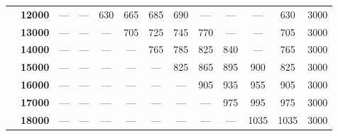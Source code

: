\documentclass[12pt,a4paper,twoside,openright,titlepage,final]{article}
\begin{document}
\begin{table}[htbp!]
{\begin{tabular}{|ccccccccccccc|}
\multicolumn{1}{|c|}{}                                & \textbf{12000}        & ---           & ---           & 630           & 665            & 685            & 690            & ---            & ---            & ---            & 630                                                                 & 3000                                                                  \\
\multicolumn{1}{|c|}{}                                & \textbf{13000}        & ---           & ---           & ---           & 705            & 725            & 745            & 770            & ---            & ---            & 705                                                                 & 3000                                                                  \\
\multicolumn{1}{|c|}{}                                & \textbf{14000}        & ---           & ---           & ---           & ---            & 765            & 785            & 825            & 840            & ---            & 765                                                                 & 3000                                                                  \\
\multicolumn{1}{|c|}{}                                & \textbf{15000}        & ---           & ---           & ---           & ---            & ---            & 825            & 865            & 895            & 900            & 825                                                                 & 3000                                                                  \\
\multicolumn{1}{|c|}{}                                & \textbf{16000}        & ---           & ---           & ---           & ---            & ---            & ---            & 905            & 935            & 955            & 905                                                                 & 3000                                                                  \\
\multicolumn{1}{|c|}{}                                & \textbf{17000}        & ---           & ---           & ---           & ---            & ---            & ---            & ---            & 975            & 995            & 975                                                                 & 3000                                                                  \\
\multicolumn{1}{|c|}{}                                & \textbf{18000}        & ---           & ---           & ---           & ---            & ---            & ---            & ---            & ---            & 1035           & 1035                                                                & 3000                                                                  \\ \hline
\end{tabular}
}
\end{table}
\end{document}
